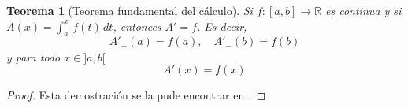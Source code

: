 \documentclass[11pt]{article}
\theoremstyle{plain}%
\newtheorem{thm}{Teorema}[section]
\theoremstyle{definition}%
\begin{document}
\begin{thm}[Teorema fundamental del cálculo]
	Si \(f:[a,b]\longrightarrow \mathbb{R}\) es continua y si \(A(x)=\int_a^x\,f(t)\,dt\), entonces \(A'=f\). Es decir,
	\[
		A'_{+}(a)=f(a),\quad A'_{-}(b)=f(b)
	\]
	y para todo \(x \in ]a,b[\)
	\[
		A'(x)=f(x)
	\]
\end{thm}
\begin{proof}
 Esta demostración se la pude encontrar en \cite[pp.\,42--43]{GR2010}. %
\end{proof}



\nocite{TA2008,greenwade93} 



\printindex


\newpage
\end{document}
